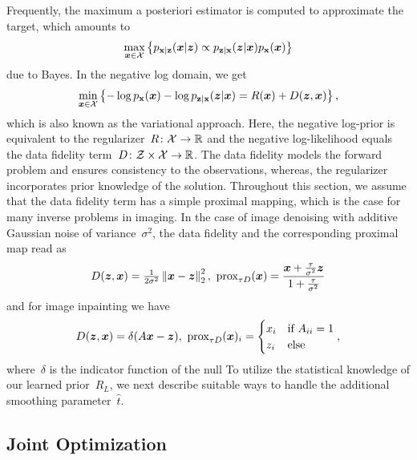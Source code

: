 \documentclass{article}
\newcommand{\X}{\mathcal{X}}
\newcommand{\Z}{\mathcal{Z}}
\newcommand{\norm}[1]{\left\Vert#1\right\Vert}
\newcommand{\prox}{\mathrm{prox}}
\def\hatt{{\widehat{t}}}
\newcommand{\pdf}[1]{p_{#1}}
\theoremstyle{plain}
\theoremstyle{definition}
\theoremstyle{remark}
\begin{document}
Frequently, the maximum a posteriori estimator is computed to approximate the target, which amounts to
\[
\max_{\vx\in\X}\left\{\pdf{\rvx\vert\rvz}(\vx\vert\vz)\propto \pdf{\rvz\vert\rvx}(\vz\vert\vx)\pdf{\rvx}(\vx)\right\}
\]
due to Bayes.
In the negative log domain, we get
\[
\min_{\vx\in\X}\left\{ -\log\pdf{\rvx}(\vx) -\log\pdf{\rvz\vert\rvx}(\vz\vert\vx) = R(\vx) + D(\vz,\vx)\right\},
\]
which is also known as the variational approach.
Here, the negative log-prior is equivalent to the regularizer~$R\colon\X\to\R$ and the negative log-likelihood equals the data fidelity term~$D\colon\Z\times\X\to\R$.
The data fidelity models the forward problem and ensures consistency to the observations, whereas, the regularizer incorporates prior knowledge of the solution.
Throughout this section, we assume that the data fidelity term has a simple proximal mapping, which is the case for many inverse problems in imaging.
In the case of image denoising with additive Gaussian noise of variance~$\sigma^2$, the data fidelity and the corresponding proximal map read as
\[
D(\vz,\vx)=\tfrac{1}{2\sigma^2}\norm{\vx-\vz}_2^2,\ \prox_{\tau D}(\vx)= \frac{\vx+\tfrac{\tau}{\sigma^2}\vz}{1+\tfrac{\tau}{\sigma^2}}    
\]
and for image inpainting we have
\[
D(\vz,\vx)=\delta(A\vx-\vz),\ \prox_{\tau D}(\vx)_i=\begin{cases}
x_i &\text{if } A_{ii} = 1\\
z_i &\text{else}
\end{cases},
\]
where~$\delta$ is the indicator function of the null 
To utilize the statistical knowledge of our learned prior~$R_L$, we next describe suitable ways to handle the additional smoothing parameter~$\hatt$.

\subsection{Joint Optimization} \label{sec:jointOptimization}
\end{document}
